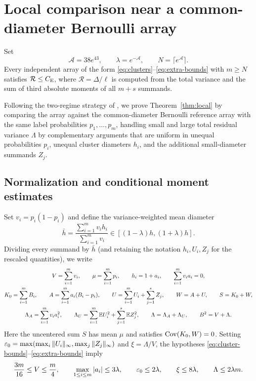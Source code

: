 \section{Local comparison near a common-diameter Bernoulli array}\label{sec:local}

\begin{theorem}\label{thm:local}
Set
\begin{equation}\label{eq:local-constants}
 \mathcal A=38e^{43},\qquad\lambda=e^{-\mathcal A},
                   \qquad N=\lceil e^{\mathcal A}\rceil.
\end{equation}
Every independent array of the form \eqref{eq:clusters}--\eqref{eq:extra-bounds}
with $m\ge N$ satisfies $\mathcal R\le C_{\mathrm E}$, where $\mathcal R=\Delta/\ell$ is
computed from the total variance and the sum of third absolute moments of all
$m+s$ summands.
\end{theorem}

Following the two-regime strategy of \citet[Section~3]{HeCheng2026}, we prove
Theorem~\ref{thm:local} by comparing the array against the common-diameter
Bernoulli reference array with the same label probabilities $p_1,\ldots,p_m$,
handling small and large total residual variance $\Lambda$ by complementary
arguments that are uniform in unequal probabilities $p_i$, unequal cluster
diameters $h_i$, and the additional small-diameter summands $Z_j$.

\subsection{Normalization and conditional moment estimates}

Set $v_i=p_i(1-p_i)$ and define the variance-weighted mean diameter
\[
 \bar h=\frac{\sum_{i=1}^m v_i h_i}{\sum_{i=1}^m v_i}\in[(1-\lambda)h,(1+\lambda)h].
\]
Dividing every summand by $\bar h$ (and retaining the notation $h_i,U_i,Z_j$
for the rescaled quantities), we write
\begin{gather*}
 V=\sum_{i=1}^m v_i,\qquad\mu=\sum_{i=1}^m p_i,
 \qquad h_i=1+a_i,\qquad\sum_{i=1}^m v_i a_i=0,\\
 K_0=\sum_{i=1}^mB_i,\qquad A=\sum_{i=1}^m a_i(B_i-p_i),\qquad
 U=\sum_{i=1}^mU_i+\sum_{j=1}^s Z_j,\qquad W=A+U,\qquad S=K_0+W,\\
 \Lambda_A=\sum_{i=1}^m v_i a_i^2,\qquad
 \Lambda_U=\sum_{i=1}^m\mathbb E U_i^2+\sum_{j=1}^s\mathbb E Z_j^2,\qquad
 \Lambda=\Lambda_A+\Lambda_U,\qquad B^2=V+\Lambda.
\end{gather*}
Here the uncentered sum $S$ has mean $\mu$ and satisfies $\operatorname{Cov}(K_0,W)=0$.
Setting $\varepsilon_0=\max(\max_i\|U_i\|_\infty,\max_j\|Z_j\|_\infty)$ and
$\xi=\Lambda/V$, the hypotheses
\eqref{eq:cluster-bounds}--\eqref{eq:extra-bounds} imply
\begin{equation}\label{eq:local-domains}
 \frac{3m}{16}\le V\le \frac m4,\qquad\max_{1\le i\le m}|a_i|\le3\lambda,\qquad
 \varepsilon_0\le2\lambda,\qquad\xi\le8\lambda,\qquad\Lambda\le2\lambda m.
\end{equation}


